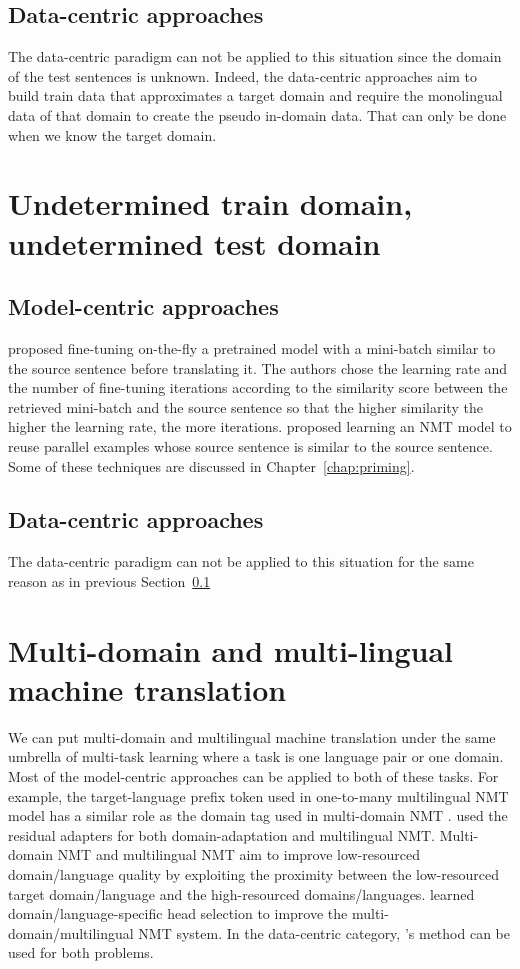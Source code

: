 \subsection{Data-centric approaches} \label{ssec:data-centric}
The data-centric paradigm can not be applied to this situation since the domain of the test sentences is unknown. Indeed, the data-centric approaches aim to build train data that approximates a target domain and require the monolingual data of that domain to create the pseudo in-domain data. That can only be done when we know the target domain.
\section{Undetermined train domain, undetermined test domain}
\label{sec:case4}
\subsection{Model-centric approaches}
\citet{Farajian17multidomain,Li18onesentence} proposed fine-tuning on-the-fly a pretrained model with a mini-batch similar to the source sentence before translating it. The authors chose the learning rate and the number of fine-tuning iterations according to the similarity score between the retrieved mini-batch and the source sentence so that the higher similarity the higher the learning rate, the more iterations. \citet{bulte19neural,bapna19non,Pham20Priming,xu20boosting} proposed learning an NMT model to reuse parallel examples whose source sentence is similar to the source sentence. Some of these techniques are discussed in Chapter~\ref{chap:priming}.
\subsection{Data-centric approaches}
The data-centric paradigm can not be applied to this situation for the same reason as in previous Section~\ref{ssec:data-centric}

\section{Multi-domain and multi-lingual machine translation}
We can put multi-domain and multilingual machine translation under the same umbrella of multi-task learning where a task is one language pair or one domain. Most of the model-centric approaches can be applied to both of these tasks. For example, the target-language prefix token used in one-to-many multilingual NMT model \citep{Johnson17google,Aharoni19massively} has a similar role as the domain tag used in multi-domain NMT \citep{Kobus17domain}. \citet{Bapna19simple} used the residual adapters for both domain-adaptation and multilingual NMT. Multi-domain NMT and multilingual NMT aim to improve low-resourced domain/language quality by exploiting the proximity between the low-resourced target domain/language and the high-resourced domains/languages. \citet{Gong21pay} learned domain/language-specific head selection to improve the multi-domain/multilingual NMT system. In the data-centric category, \cite{Wang20balancing}'s method can be used for both problems.

